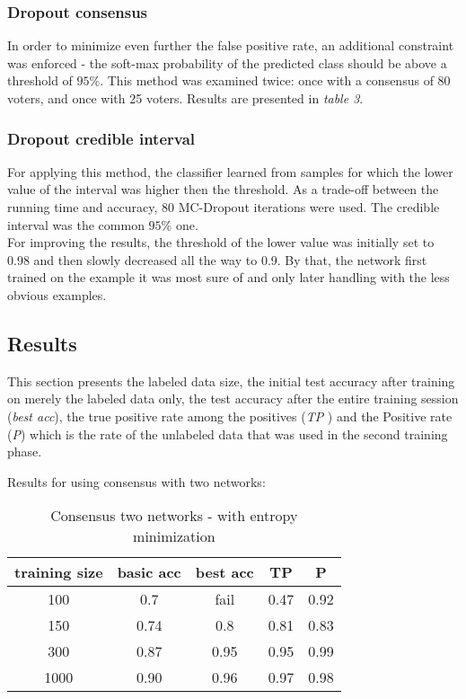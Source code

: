 \documentclass[conference, letterpaper]{IEEEtran}
\begin{document}
 \subsubsection{Dropout consensus}
  In order to minimize even further the false positive rate, an additional constraint was enforced - the soft-max probability of the predicted class should be above a threshold of $95\%$. 
 This method was examined twice: once with a consensus of 80 voters, and once with 25 voters. Results are presented in \textit{table 3}.

 \subsubsection{Dropout credible interval}
 For applying this method, the classifier learned from samples
for which the lower value of the interval was higher then the threshold.
  As a trade-off between the running time and accuracy, 80 MC-Dropout iterations were used. The credible interval was the common $95\%$ one.\\ For improving the results, the threshold of the lower value was initially set to 0.98 and then slowly decreased all the way to 0.9. By that, the network first trained on the example it was most sure of and only later handling  with the less obvious examples. 
  
\subsection{Results}
This section presents the labeled data size, the initial test accuracy after training on merely the labeled data only, the test accuracy after the entire training session (\textit{best acc}), the true positive rate among the positives (\textit{TP} ) and the Positive rate (\textit{P}) which is the rate of the unlabeled data that was used in the second training phase. 


Results for using consensus with two networks:

\begin{table}
\begin{center}
\begin{tabular}{|c|c|c|c|c|}\hline
training size & basic acc  & best acc & TP & P \\[1 ex] \hline\hline
100  & 0.7  &  fail  & 0.47 & 0.92\\
150  & 0.74 &  0.8  & 0.81 & 0.83\\
300  & 0.87  & 0.95 & 0.95 & 0.99\\
1000 & 0.90  & 0.96 & 0.97 & 0.98 \\ \hline
\end{tabular}
\end{center}
\caption{Consensus two networks - with entropy minimization}
\label{table:1}
\end{table}
\end{document}
